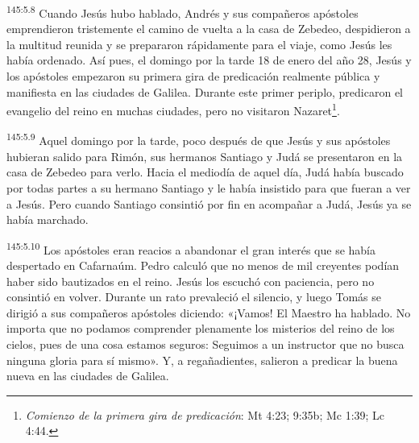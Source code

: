 \par 
\textsuperscript{145:5.8} Cuando Jesús hubo hablado, Andrés y sus compañeros apóstoles emprendieron tristemente el camino de vuelta a la casa de Zebedeo, despidieron a la multitud reunida y se prepararon rápidamente para el viaje, como Jesús les había ordenado. Así pues, el domingo por la tarde 18 de enero del año 28, Jesús y los apóstoles empezaron su primera gira de predicación realmente pública y manifiesta en las ciudades de Galilea. Durante este primer periplo, predicaron el evangelio del reino en muchas ciudades, pero no visitaron Nazaret\footnote{\textit{Comienzo de la primera gira de predicación}: Mt 4:23; 9:35b; Mc 1:39; Lc 4:44.}.

\par 
\textsuperscript{145:5.9} Aquel domingo por la tarde, poco después de que Jesús y sus apóstoles hubieran salido para Rimón, sus hermanos Santiago y Judá se presentaron en la casa de Zebedeo para verlo. Hacia el mediodía de aquel día, Judá había buscado por todas partes a su hermano Santiago y le había insistido para que fueran a ver a Jesús. Pero cuando Santiago consintió por fin en acompañar a Judá, Jesús ya se había marchado.

\par 
\textsuperscript{145:5.10} Los apóstoles eran reacios a abandonar el gran interés que se había despertado en Cafarnaúm. Pedro calculó que no menos de mil creyentes podían haber sido bautizados en el reino. Jesús los escuchó con paciencia, pero no consintió en volver. Durante un rato prevaleció el silencio, y luego Tomás se dirigió a sus compañeros apóstoles diciendo: «¡Vamos! El Maestro ha hablado. No importa que no podamos comprender plenamente los misterios del reino de los cielos, pues de una cosa estamos seguros: Seguimos a un instructor que no busca ninguna gloria para sí mismo». Y, a regañadientes, salieron a predicar la buena nueva en las ciudades de Galilea.
